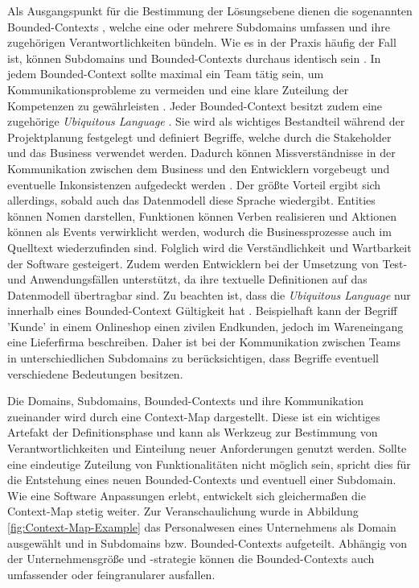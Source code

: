 Als Ausgangspunkt für die Bestimmung der Lösungsebene dienen die sogenannten Bounded-Contexts \cite[S. 57]{Vernon.2015}, welche eine oder mehrere Subdomains umfassen und ihre zugehörigen Verantwortlichkeiten bündeln. Wie es in der Praxis häufig der Fall ist, können Subdomains und Bounded-Contexts durchaus identisch sein \cite[S. 57]{Vernon.2015}. In jedem Bounded-Context sollte maximal ein Team tätig sein, um Kommunikationsprobleme zu vermeiden und eine klare Zuteilung der Kompetenzen zu gewährleisten \cite{Brandolini.2021}. Jeder Bounded-Context besitzt zudem eine zugehörige \emph{Ubiquitous Language} \cite[S. 62]{Vernon.2015}. Sie wird als wichtiges Bestandteil während der Projektplanung festgelegt und definiert Begriffe, welche durch die Stakeholder und das Business verwendet werden. Dadurch können Missverständnisse in der Kommunikation zwischen dem Business und den Entwicklern vorgebeugt und eventuelle Inkonsistenzen aufgedeckt werden \cite[S. 336f.]{Evans.2011}. Der größte Vorteil ergibt sich allerdings, sobald auch das Datenmodell diese Sprache wiedergibt. Entities können Nomen darstellen, Funktionen können Verben realisieren und Aktionen können als Events verwirklicht werden, wodurch die Businessprozesse auch im Quelltext wiederzufinden sind. Folglich wird die Verständlichkeit und Wartbarkeit der Software \cite[S. 24ff.]{Evans.2011} gesteigert. Zudem werden Entwicklern bei der Umsetzung von Test- und Anwendungsfällen unterstützt, da ihre textuelle Definitionen auf das Datenmodell übertragbar sind. Zu beachten ist, dass die \emph{Ubiquitous Language} nur innerhalb eines Bounded-Context Gültigkeit hat \cite[S. 62]{Vernon.2015}. Beispielhaft kann der Begriff 'Kunde' in einem Onlineshop einen zivilen Endkunden, jedoch im Wareneingang eine Lieferfirma beschreiben. Daher ist bei der Kommunikation zwischen Teams in unterschiedlichen Subdomains zu berücksichtigen, dass Begriffe eventuell verschiedene Bedeutungen besitzen.

Die Domains, Subdomains, Bounded-Contexts und ihre Kommunikation zueinander wird durch eine Context-Map dargestellt. Diese ist ein wichtiges Artefakt der Definitionsphase und kann als Werkzeug zur Bestimmung von Verantwortlichkeiten und Einteilung neuer Anforderungen genutzt werden. Sollte eine eindeutige Zuteilung von Funktionalitäten nicht möglich sein, spricht dies für die Entstehung eines neuen Bounded-Contexts und eventuell einer Subdomain. Wie eine Software Anpassungen erlebt, entwickelt sich gleichermaßen die Context-Map stetig weiter. \cite[S. 87ff]{Vernon.2015} Zur Veranschaulichung wurde in Abbildung \ref{fig:Context-Map-Example} das Personalwesen eines Unternehmens als Domain ausgewählt und in Subdomains bzw. Bounded-Contexts aufgeteilt. Abhängig von der Unternehmensgröße und -strategie können die Bounded-Contexts auch umfassender oder feingranularer ausfallen.

